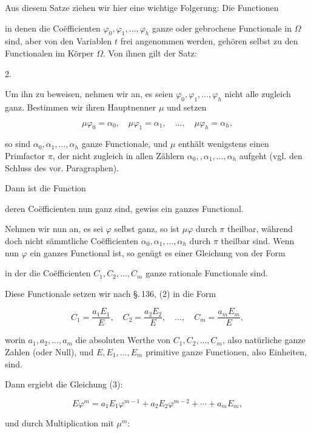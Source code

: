 
Aus diesem Satze ziehen wir hier eine wichtige Folgerung: Die Functionen


in denen die Co\"efficienten $\varphi_0, \varphi_1, \ldots, \varphi_h$ ganze oder gebrochene Functionale in $\Omega$ sind, aber von den Variablen $t$ frei angenommen werden, geh\"oren selbst zu den Functionalen im K\"orper $\Omega$. Von ihnen gilt der Satz:

2. 

Um ihn zu beweisen, nehmen wir an, es seien $\varphi_0, \varphi_1, \ldots, \varphi_h$ nicht alle zugleich ganz. Bestimmen wir ihren Hauptnenner $\mu$ und setzen

\[
\mu\varphi_0 = \alpha_0, \quad \mu\varphi_1 = \alpha_1, \quad \ldots, \quad \mu\varphi_h = \alpha_h,
\]

so sind $\alpha_0, \alpha_1, \ldots, \alpha_h$ ganze Functionale, und $\mu$ enth\"alt wenigstens einen Primfactor $\pi$, der nicht zugleich in allen Z\"ahlern $\alpha_0,, \alpha_1, \ldots, \alpha_h$ aufgeht %
(vgl. den Schluss des vor. Paragraphen).

Dann ist die Function


deren Co\"efficienten nun ganz sind, gewiss ein ganzes Functional.

Nehmen wir nun an, es sei $\varphi$ selbst ganz, so ist $\mu\varphi$ durch $\pi$ theilbar, w\"ahrend doch nicht s\"ammtliche Co\"efficienten $\alpha_0, \alpha_1, \ldots, \alpha_h$ durch $\pi$ theilbar sind. Wenn nun $\varphi$ ein ganzes Functional ist, so gen\"ugt es einer Gleichung von der Form


in der die Co\"efficienten $C_1, C_2, \ldots, C_m$ ganze rationale Functionale sind.

Diese Functionale setzen wir nach \S.\,136, (2) in die Form

\[
C_1 = \frac{a_1 E_1}{E}, \quad C_2 = \frac{a_2 E_2}{E}, \quad \ldots, \quad C_m = \frac{a_m E_m}{E},
\]

worin $a_1, a_2, \ldots, a_m$ die absoluten Werthe von $C_1, C_2, \ldots, C_m$, also nat\"urliche ganze Zahlen (oder Null), und $E, E_1, \ldots, E_m$ primitive ganze Functionen, also Einheiten, sind.

Dann ergiebt die Gleichung (3):

\[
E\varphi^m = a_1 E_1 \varphi^{m-1} + a_2 E_2 \varphi^{m-2} + \cdots + a_m E_m,
\]

und durch Multiplication mit $\mu^m$:


